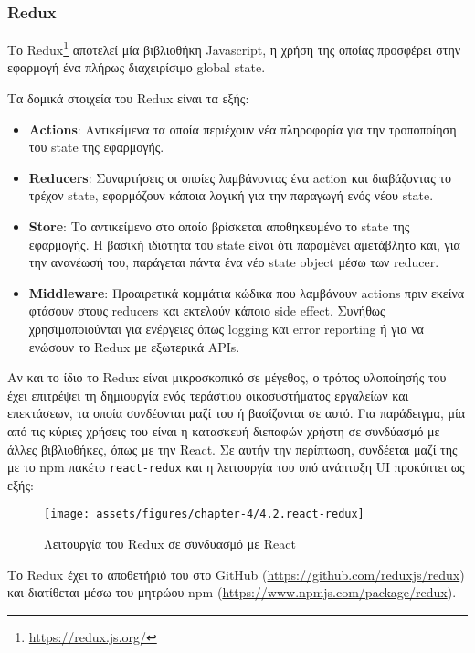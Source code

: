 \subsubsection{Redux} \label{subsection:4-2-2-1-redux}


Το Redux\footnote{\url{https://redux.js.org/}} αποτελεί μία βιβλιοθήκη Javascript, η χρήση της οποίας προσφέρει στην εφαρμογή ένα πλήρως διαχειρίσιμο global state.

Τα δομικά στοιχεία του Redux είναι τα εξής:
\begin{itemize}
	\item \textbf{Actions}: Αντικείμενα τα οποία περιέχουν νέα πληροφορία για την τροποποίηση του state της εφαρμογής.
	\item \textbf{Reducers}: Συναρτήσεις οι οποίες λαμβάνοντας ένα action και διαβάζοντας το τρέχον state, εφαρμόζουν κάποια λογική για την παραγωγή ενός νέου state.
	\item \textbf{Store}: Το αντικείμενο στο οποίο βρίσκεται αποθηκευμένο το state της εφαρμογής. Η βασική ιδιότητα του state είναι ότι παραμένει αμετάβλητο και, για την ανανέωσή του, παράγεται πάντα ένα νέο state object μέσω των reducer.
	\item \textbf{Middleware}: Προαιρετικά κομμάτια κώδικα που λαμβάνουν actions πριν εκείνα φτάσουν στους reducers και εκτελούν κάποιο side effect. Συνήθως χρησιμοποιούνται για ενέργειες όπως logging και error reporting ή για να ενώσουν το Redux με εξωτερικά APIs. 
\end{itemize}

Αν και το ίδιο το Redux είναι μικροσκοπικό σε μέγεθος, ο τρόπος υλοποίησής του έχει επιτρέψει τη δημιουργία ενός τεράστιου οικοσυστήματος εργαλείων και επεκτάσεων, τα οποία συνδέονται μαζί του ή βασίζονται σε αυτό. Για παράδειγμα, μία από τις κύριες χρήσεις του είναι η κατασκευή διεπαφών χρήστη σε συνδύασμό με άλλες βιβλιοθήκες, όπως με την React. Σε αυτήν την περίπτωση, συνδέεται μαζί της με το npm πακέτο \texttt{react-redux} και η λειτουργία του υπό ανάπτυξη UI προκύπτει ως εξής:

\begin{figure}[H]
	\centering
	\texttt{[image: assets/figures/chapter-4/4.2.react-redux]}
	\caption{Λειτουργία του Redux σε συνδυασμό με React}
\end{figure}

Το Redux έχει το αποθετήριό του στο GitHub (\url{https://github.com/reduxjs/redux}) και διατίθεται μέσω του μητρώου npm (\url{https://www.npmjs.com/package/redux}).
